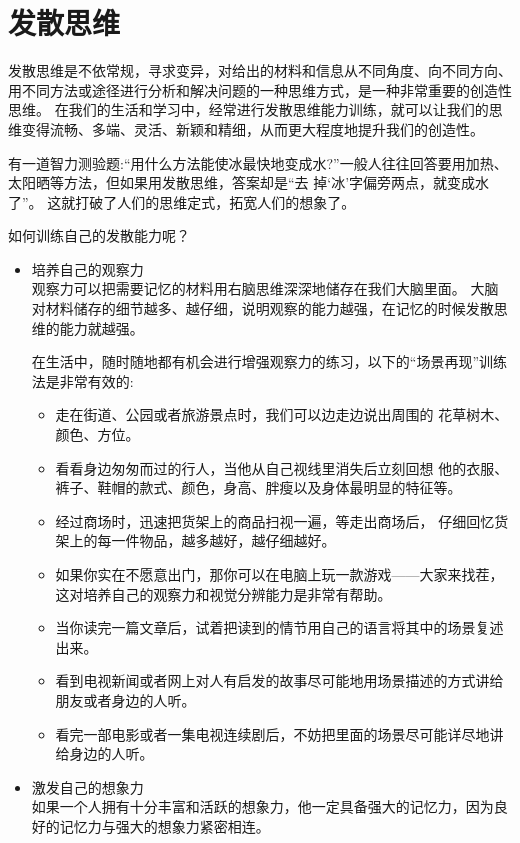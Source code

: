 \section{发散思维}

发散思维是不依常规，寻求变异，对给出的材料和信息从不同角度、向不同方向、用不同方法或途径进行分析和解决问题的一种思维方式，是一种非常重要的创造性思维。
在我们的生活和学习中，经常进行发散思维能力训练，就可以让我们的思维变得流畅、多端、灵活、新颖和精细，从而更大程度地提升我们的创造性。

有一道智力测验题:“用什么方法能使冰最快地变成水?”一般人往往回答要用加热、太阳晒等方法，但如果用发散思维，答案却是“去 掉‘冰’字偏旁两点，就变成水了”。
这就打破了人们的思维定式，拓宽人们的想象了。

如何训练自己的发散能力呢？
\begin{itemize}
\item 培养自己的观察力\\
  观察力可以把需要记忆的材料用右脑思维深深地储存在我们大脑里面。
  大脑对材料储存的细节越多、越仔细，说明观察的能力越强，在记忆的时候发散思维的能力就越强。

  在生活中，随时随地都有机会进行增强观察力的练习，以下的“场景再现”训练法是非常有效的:
  \begin{itemize}
  \item 走在街道、公园或者旅游景点时，我们可以边走边说出周围的 花草树木、颜色、方位。
  \item 看看身边匆匆而过的行人，当他从自己视线里消失后立刻回想 他的衣服、裤子、鞋帽的款式、颜色，身高、胖瘦以及身体最明显的特征等。
  \item 经过商场时，迅速把货架上的商品扫视一遍，等走出商场后， 仔细回忆货架上的每一件物品，越多越好，越仔细越好。
  \item 如果你实在不愿意出门，那你可以在电脑上玩一款游戏——大家来找茬，这对培养自己的观察力和视觉分辨能力是非常有帮助。
  \item 当你读完一篇文章后，试着把读到的情节用自己的语言将其中的场景复述出来。
  \item 看到电视新闻或者网上对人有启发的故事尽可能地用场景描述的方式讲给朋友或者身边的人听。
  \item 看完一部电影或者一集电视连续剧后，不妨把里面的场景尽可能详尽地讲给身边的人听。
  \end{itemize}
\item 激发自己的想象力\\
  如果一个人拥有十分丰富和活跃的想象力，他一定具备强大的记忆力，因为良好的记忆力与强大的想象力紧密相连。


\end{itemize}
